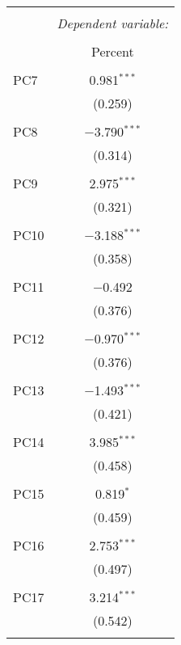 
\begin{table}[!htbp] \centering 
  \caption{} 
  \label{} 
\begin{tabular}{@{\extracolsep{5pt}}lc} 
\\[-1.8ex]\hline 
\hline \\[-1.8ex] 
 & \multicolumn{1}{c}{\textit{Dependent variable:}} \\ 
\cline{2-2} 
\\[-1.8ex] & Percent \\ 
\hline \\[-1.8ex] 
 PC7 & 0.981$^{***}$ \\ 
  & (0.259) \\ 
  & \\ 
 PC8 & $-$3.790$^{***}$ \\ 
  & (0.314) \\ 
  & \\ 
 PC9 & 2.975$^{***}$ \\ 
  & (0.321) \\ 
  & \\ 
 PC10 & $-$3.188$^{***}$ \\ 
  & (0.358) \\ 
  & \\ 
 PC11 & $-$0.492 \\ 
  & (0.376) \\ 
  & \\ 
 PC12 & $-$0.970$^{***}$ \\ 
  & (0.376) \\ 
  & \\ 
 PC13 & $-$1.493$^{***}$ \\ 
  & (0.421) \\ 
  & \\ 
 PC14 & 3.985$^{***}$ \\ 
  & (0.458) \\ 
  & \\ 
 PC15 & 0.819$^{*}$ \\ 
  & (0.459) \\ 
  & \\ 
 PC16 & 2.753$^{***}$ \\ 
  & (0.497) \\ 
  & \\ 
 PC17 & 3.214$^{***}$ \\ 
  & (0.542) \\ 
  & \\ 

\end{tabular}
\end{table}
